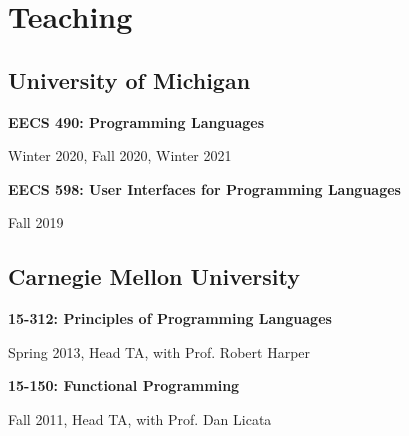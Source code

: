 \documentclass[10pt,letterpaper]{article}
\renewenvironment{itemize}{
  \begin{list}{}{
    \setlength{\leftmargin}{1.25em}
    \setlength{\itemsep}{0.25em}
    \setlength{\parskip}{0pt}
    \setlength{\parsep}{0.2em}
  }
}{
  \end{list}
}
\begin{document}
%


\section*{Teaching}
\subsection*{University of Michigan}
\begin{itemize}
  \item \textbf{EECS 490: Programming Languages} 
    \begin{itemize}
      \item Winter 2020, Fall 2020, Winter 2021
    \end{itemize}
  \item \textbf{EECS 598: User Interfaces for Programming Languages}
    \begin{itemize} 
      \item Fall 2019
    \end{itemize}
\end{itemize}

\subsection*{Carnegie Mellon University}
\begin{itemize}
  \item \textbf{15-312: Principles of Programming Languages} 
        \begin{itemize}
          \item Spring 2013, Head TA, with Prof. Robert Harper
        \end{itemize}
  \item \textbf{15-150: Functional Programming}
      \begin{itemize}
        \item Fall 2011, Head TA, with Prof. Dan Licata
      \end{itemize}
\end{itemize}
\end{document}
